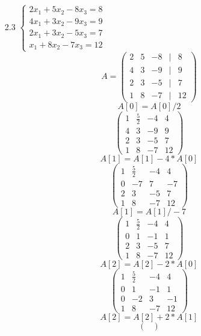 \documentclass[a4paper]{article}
\begin{document}
\begin{enumerate}
\begin{enumerate}
        \item[2.3]
        $\begin{cases}
            2x_1 + 5x_2 - 8 x_3 = 8 \\
            4x_1 + 3x_2 - 9x_3 = 9 \\
            2x_1 + 3x_2 - 5x_3 = 7 \\
            x_1 + 8 x_2 - 7x_3 = 12
        \end{cases}$\\
        \[A = \begin{pmatrix}
            2 & 5 & -8 & | & 8 \\
            4 & 3 & -9 & | & 9 \\
            2 & 3 & -5 & | & 7 \\
            1 & 8 & -7 & | & 12
        \end{pmatrix}\]
        \[A[0] = A[0]/2\]
        \[
        \begin{pmatrix}
        1 & \frac{5}{2} & -4 & 4 \\
        4 & 3 & -9 & 9 \\
        2 & 3 & -5 & 7 \\
        1 & 8 & -7 & 12
        \end{pmatrix}
        \]
        \[A[1] = A[1]-4*A[0]\]
        \[
        \begin{pmatrix}
        1 & \frac{5}{2} & -4 & 4 \\
        0 & -7 & 7 & -7 \\
        2 & 3 & -5 & 7 \\
        1 & 8 & -7 & 12
        \end{pmatrix}
        \]
        \[A[1] = A[1]/-7\]
        \[
        \begin{pmatrix}
        1 & \frac{5}{2} & -4 & 4 \\
        0 & 1 & -1 & 1 \\
        2 & 3 & -5 & 7 \\
        1 & 8 & -7 & 12
        \end{pmatrix}
        \]
        \[A[2] = A[2]-2*A[0]\]
        \[
        \begin{pmatrix}
        1 & \frac{5}{2} & -4 & 4 \\
        0 & 1 & -1 & 1 \\
        0 & -2 & 3 & -1 \\
        1 & 8 & -7 & 12
        \end{pmatrix}
        \]
        \[A[2] = A[2]+2*A[1]\]
        \[
        \begin{pmatrix}

\end{pmatrix}\]
\end{enumerate}
\end{enumerate}
\end{document}
